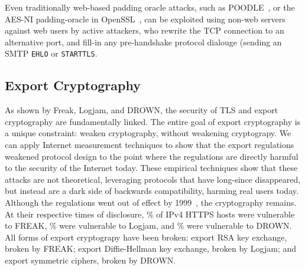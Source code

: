 Even traditionally web-based padding oracle attacks, such as
POODLE~\cite{poodle-2014}, or the AES-NI padding-oracle in
OpenSSL~\cite{aes-ni-cve}, can be exploited using non-web servers against web
users by active attackers, who rewrite the TCP connection to an alternative
port, and fill-in any pre-handshake protocol dialouge (\eg sending an SMTP
\texttt{EHLO} or \texttt{STARTTLS}.

\subsection{Export Cryptography}


As shown by Freak, Logjam, and DROWN, the security of TLS and export
cryptography are fundamentally linked. The entire goal of export cryptography
is a unique constraint: weaken cryptography, without weakening cryptograpy. We
can apply Internet measurement techniques to show that the export regulations
weakened protocol design to the point where the regulations are directly
harmful to the security of the Internet today. These empirical techniques show
that these attacks are not theoretical, leveraging protocols that have
long-since disappeared, but instead are a dark side of backwards compatibility,
harming real users today.  Although the regulations went out of effect by
1999~\cite{djb-timeline}, the cryptography remains. At their respective times
of disclosure, \TK\% of IPv4 HTTPS hosts were vulnerable to FREAK, \TK\% were
vulnerable to Logjam, and \TK\% were vulnerable to DROWN. All forms of export
cryptograpy have been broken: export RSA key exchange, broken by FREAK; export
Diffie-Hellman key exchange, broken by Logjam; and export symmetric ciphers,
broken by DROWN.


%
%
%
%
%
%
%
%
%
%
%
%
%
%
